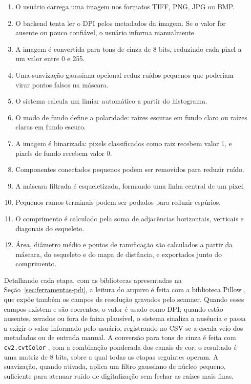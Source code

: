 \documentclass[12pt]{article}
\begin{document}
\begin{enumerate}
  \item O usuário carrega uma imagem nos formatos TIFF, PNG, JPG ou BMP.
  \item O backend tenta ler o DPI pelos metadados da imagem. Se o valor for ausente ou pouco confiável, o usuário informa manualmente.
  \item A imagem é convertida para tons de cinza de 8 bits, reduzindo cada pixel a um valor entre 0 e 255.
  \item Uma suavização gaussiana opcional reduz ruídos pequenos que poderiam virar pontos falsos na máscara.
  \item O sistema calcula um limiar automático a partir do histograma.
  \item O modo de fundo define a polaridade: raízes escuras em fundo claro ou raízes claras em fundo escuro.
  \item A imagem é binarizada: pixels classificados como raiz recebem valor 1, e pixels de fundo recebem valor 0.
  \item Componentes conectados pequenos podem ser removidos para reduzir ruído.
  \item A máscara filtrada é esqueletizada, formando uma linha central de um pixel.
  \item Pequenos ramos terminais podem ser podados para reduzir espúrios.
  \item O comprimento é calculado pela soma de adjacências horizontais, verticais e diagonais do esqueleto.
  \item Área, diâmetro médio e pontos de ramificação são calculados a partir da máscara, do esqueleto e do mapa de distância, e exportados junto do comprimento.
\end{enumerate}

Detalhando cada etapa, com as bibliotecas apresentadas na Seção~\ref{sec:ferramentas-pdi}, a leitura do arquivo é feita com a biblioteca Pillow \cite{clark2015pillow}, que expõe também os campos de resolução gravados pelo scanner. Quando esses campos existem e são coerentes, o valor é usado como DPI; quando estão ausentes, zerados ou fora de faixa plausível, o sistema sinaliza a ausência e passa a exigir o valor informado pelo usuário, registrando no CSV se a escala veio dos metadados ou de entrada manual. A conversão para tons de cinza é feita com \texttt{cv2.cvtColor} \cite{bradski2000opencv}, com a combinação ponderada dos canais de cor; o resultado é uma matriz de 8 bits, sobre a qual todas as etapas seguintes operam. A suavização, quando ativada, aplica um filtro gaussiano de núcleo pequeno, suficiente para atenuar ruído de digitalização sem fechar as raízes mais finas.
\end{document}
